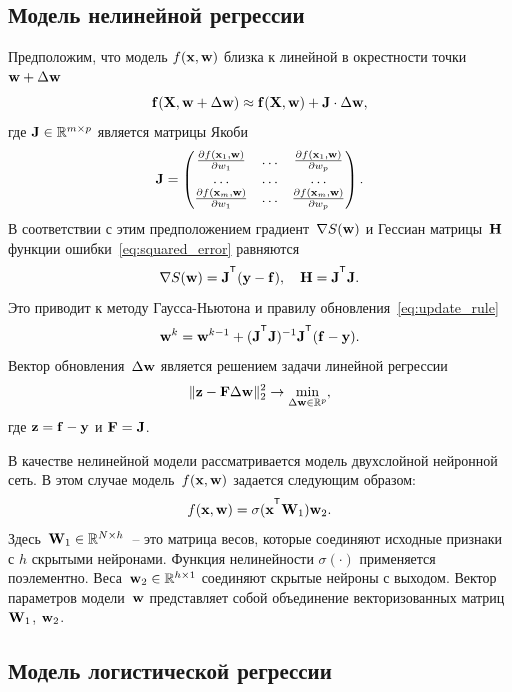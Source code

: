 \subsection{Модель нелинейной регрессии}
Предположим, что модель $f (\mathbf{x} , \mathbf{w})$ близка к линейной в окрестности точки $\mathbf{w} + \Delta \mathbf{w}$
\[
\mathbf{f}(\mathbf{X} , \mathbf{w} + \Delta \mathbf{w}) \approx \mathbf{f}(\mathbf{X} , \mathbf{w}) + \mathbf{J} \cdot \Delta  \mathbf{w},
\]
где $\mathbf{J} \in \mathbb{R}^{m \times p}$ является матрицы Якоби
\begin{equation}
\mathbf{J} = 
\begin{pmatrix}
\frac{\partial f(\mathbf{x}_1 , \mathbf{w})}{\partial w_1} & \dots & 
\frac{\partial f(\mathbf{x}_1 , \mathbf{w})}{\partial w_p} \\
\dots & \dots & \dots \\
\frac{\partial f(\mathbf{x}_m , \mathbf{w})}{\partial w_1} & \dots & 
\frac{\partial f(\mathbf{x}_m , \mathbf{w})}{\partial w_p}
\end{pmatrix}.
\end{equation}
В соответствии с этим предположением градиент~$\nabla S(\mathbf{w})$ и Гессиан матрицы~$\mathbf{H}$ функции ошибки~\eqref{eq:squared_error} равняются
\begin{equation}
\nabla S(\bw) = \bJ^{\T} (\by - \mathbf{f}), \quad \bH = \bJ^{\T} \bJ.
\label{eq:nonlin_reg_deriv}
\end{equation}
Это приводит к методу Гаусса-Ньютона и правилу обновления~\eqref{eq:update_rule}
\[
\bw^k = \bw^{k - 1} + (\bJ^{\T} \bJ)^{-1}\bJ^{\T}(\mathbf{f} - \by).
\]
Вектор обновления~$\Delta \mathbf{w}$ является решением задачи линейной регрессии
\begin{equation}
\| \mathbf{z} - \mathbf{F} \Delta \mathbf{w} \|_2^2 \rightarrow \min_{\Delta \mathbf{w} \in \mathbb{R}^{p}},
\label{eq:lin_reg_nonlin_reg}
\end{equation}
где $\mathbf{z} = \mathbf{f} - \mathbf{y}$ и $\mathbf{F} = \mathbf{J}$.

В качестве нелинейной модели рассматривается модель двухслойной нейронной сеть. В этом случае модель~$f (\mathbf{x}, \mathbf{w})$ задается
следующим образом:
\[
f(\bx, \bw) = \sigma(\bx^{\T} \bW_1) \bw_2.
\]
Здесь~$\mathbf{W}_1 \in \mathbb{R}^{N \times h}$~-- это матрица весов, которые соединяют исходные признаки с $h$ скрытыми нейронами. Функция нелинейности $\sigma(\cdot)$ применяется поэлементно. Веса~$\mathbf{w}_2 \in \mathbb{R}^{h \times 1}$ соединяют скрытые нейроны с выходом. 
Вектор параметров модели~$\mathbf{w}$ представляет собой объединение векторизованных матриц~$\mathbf{W}_1$, $\mathbf{w}_2$.

\subsection{Модель логистической регрессии}

